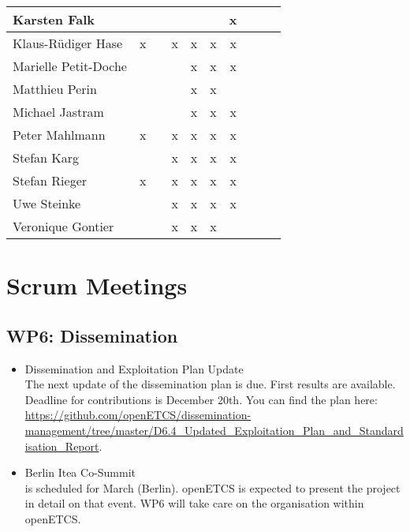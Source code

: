 \documentclass[a4paper, 11pt]{article}
\begin{document}
\begin{tabular}{|l|c|c|c||c|c|c||c|c|c|}
Karsten Falk         &   &   &   &   &   & x \\\hline
Klaus-R\"udiger Hase & x &   & x & x & x & x \\\hline
Marielle Petit-Doche &   &   &   & x & x & x \\\hline
Matthieu Perin       &   &   &   & x & x &   \\\hline
Michael Jastram      &   &   &   & x & x & x \\\hline
Peter Mahlmann       & x&   & x & x & x & x \\\hline
Stefan Karg          &   &   & x & x & x & x \\\hline
Stefan Rieger        & x &   & x & x & x & x \\\hline
Uwe Steinke          &   &   & x & x & x & x \\\hline
Veronique Gontier    &   &   & x & x & x &   \\\hline
\end{tabular}


\section{Scrum Meetings}

\subsection{WP6: Dissemination}
\begin{itemize}
\item Dissemination and Exploitation Plan Update\\
The next update of the dissemination plan is due. First results are available. 
Deadline for contributions is December 20th. You can find the plan here:
\url{https://github.com/openETCS/dissemination-management/tree/master/D6.4_Updated_Exploitation_Plan_and_Standardisation_Report}.

\item Berlin Itea Co-Summit\\
is scheduled for March (Berlin). openETCS is expected to present the project in detail on that event. WP6 will take care on the organisation within openETCS.
\end{itemize}
\end{document}
